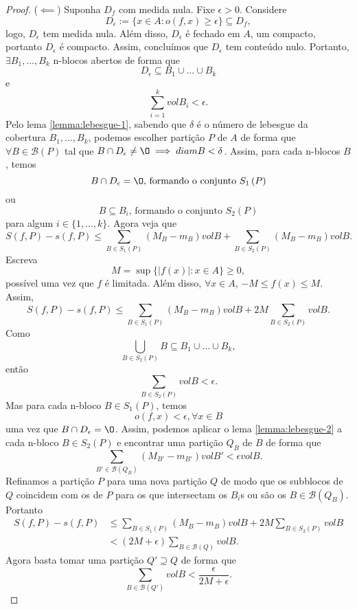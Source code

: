 \begin{proof}
    ($\impliedby$) Suponha $D_f$ com medida nula. Fixe $\epsilon>0$. Considere \[
	D_\epsilon := \{x\in A : o\left( f,x \right) \ge \epsilon\} \subseteq D_f
    ,\] logo, $D_\epsilon$ tem medida nula. Além disso, $D_\epsilon$ é fechado em $A$, um compacto, portanto $D_\epsilon$ é compacto. Assim, concluímos que $D_\epsilon$ tem conteúdo nulo. Portanto, $\exists B_1,\ldots,B_k$ n-blocos abertos de forma que \[
	D_\epsilon \subseteq B_1\cup \ldots\cup B_k
    \] e \[
	\sum_{i=1}^{k} vol B_i < \epsilon
	.\] Pelo lema \ref{lemma:lebesgue-1}, sabendo que $\delta$ é o número de lebesgue da cobertura $B_1,\ldots,B_k$, podemos escolher partição $P$ de $A$ de forma que $\forall B\in \mathcal{B}\left( P \right) $ tal que $B\cap D_\epsilon \neq \O \implies diam B < \delta$. Assim, para cada n-blocos $B$, temos \[
    B\cap D_\epsilon = \O \text{, formando o conjunto $S_1\left( P \right) $}
    \] ou \[
    B \subseteq B_i\text{, formando o conjunto $S_2\left( P \right) $}
    \] para algum $i\in \{1,\ldots,k\}$. Agora veja que \[
    S\left( f, P \right) - s\left( f,P \right) \le \sum_{B\in S_1\left( P \right)	 } \left( M_B - m_B \right) vol B + \sum_{B\in S_2\left( P \right)	 } \left( M_B - m_B \right) vol B
    .\] Escreva \[
    M = \sup \{\left| f\left( x \right)  \right| : x\in A\} \ge 0
    ,\] possível uma vez que $f$ é limitada. Além disso, $\forall x\in A$, $-M \le f\left( x \right) \le M$. Assim, \[
    S\left( f, P \right) - s\left( f,P \right) \le \sum_{B\in S_1\left( P \right)	 } \left( M_B - m_B \right) vol B + 2M \sum_{B\in S_2\left( P \right)	 } vol B
    .\] Como \[
    \bigcup_{B\in S_2\left( P \right) } B \subseteq B_1\cup \ldots\cup B_k
    ,\] então \[
    \sum_{B\in S_2\left( P \right) } vol B < \epsilon
    .\] Mas para cada n-bloco $B\in S_1\left( P \right) $, temos \[
    o\left( f, x \right) < \epsilon, \forall x\in B
    \] uma vez que $B\cap D_\epsilon = \O$. Assim, podemos aplicar o lema \ref{lemma:lebesgue-2} a cada n-bloco $B\in S_2\left( P \right) $ e encontrar uma partição $Q_B$ de $B$ de forma que \[
    \sum_{B'\in \mathcal{B}\left( Q_B \right) } \left( M_{B'} - m_{B'} \right) vol B' < \epsilon vol B
    .\] Refinamos a partição $P$ para uma nova partição $Q$ de modo que os subblocos de $Q$ coincidem com os de $P$ para os que intersectam os $B_i$s ou são os $B\in \mathcal{B}\left( Q_B \right) $. Portanto
    \begin{align*}
	S\left( f, P \right) - s\left( f,P \right) &\le \sum_{B\in S_1\left( P \right)	 } \left( M_B - m_B \right) vol B + 2M \sum_{B\in S_2\left( P \right)	 } vol B \\
						   &< \left( 2M + \epsilon \right) \sum_{B\in \mathcal{B}\left( Q \right) } vol B
    .\end{align*}
    Agora basta tomar uma partição $Q' \supseteq Q $ de forma que \[
    \sum_{B\in \mathcal{B}\left( Q' \right) } vol B < \frac{\epsilon}{2M + \epsilon}
    .\] 


\end{proof}
